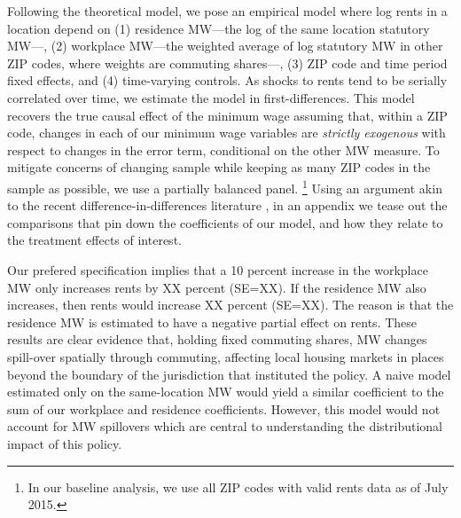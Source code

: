 Following the theoretical model, we pose an empirical model where log rents in 
a location depend on 
(1) residence MW---the log of the same location statutory MW---,
(2) workplace MW---the weighted average of log statutory MW in other ZIP codes,
where weights are commuting shares---,
(3)  ZIP code and time period fixed effects,
and 
(4) time-varying controls.
As shocks to rents tend to be serially correlated over time, we estimate the model 
in first-differences.
This model recovers the true causal effect of the minimum wage assuming that, 
within a ZIP code, changes in each of our minimum wage variables are 
\textit{strictly exogenous} with respect to changes in the error term, conditional
on the other MW measure.
To mitigate concerns of changing sample while keeping as many ZIP codes in the sample
as possible, we use a partially balanced panel.%
\footnote{In our baseline analysis, we use all ZIP codes with valid rents data
as of July 2015.}
Using an argument akin to the recent difference-in-differences literature
\parencite[e.g.,][]{CallawaySantAnna2021,CallawayEtAl2021}, 
in an appendix we tease out the comparisons that pin down the coefficients of our 
model, and how they relate to the treatment effects of interest.


Our prefered specification implies that a 10 percent increase in the workplace MW
only increases rents by XX percent (SE=XX).
If the residence MW also increases, then rents would increase XX percent (SE=XX).
The reason is that the residence MW is estimated to have a negative partial effect
on rents.
These results are clear evidence that, holding fixed commuting shares, MW changes 
spill-over spatially through commuting, affecting local housing markets in places
beyond the boundary of the jurisdiction that instituted the policy.
A naive model estimated only on the same-location MW would yield a similar coefficient
to the sum of our workplace and residence coefficients.
However, this model would not account for MW spillovers which are central to 
understanding the distributional impact of this policy.



